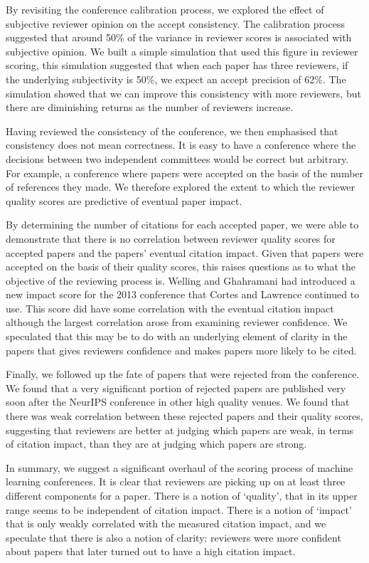 \documentclass[twoside]{article}
\begin{document}
By revisiting the conference calibration process, we explored the
effect of subjective reviewer opinion on the accept consistency. The
calibration process suggested that around 50\% of the variance in
reviewer scores is associated with subjective opinion. We built a
simple simulation that used this figure in reviewer scoring, this
simulation suggested that when each paper has three reviewers, if the
underlying subjectivity is 50\%, we expect an accept precision of
62\%. The simulation showed that we can improve this consistency with
more reviewers, but there are diminishing returns as the number of
reviewers increase.

Having reviewed the consistency of the conference, we then emphasised
that consistency does not mean correctness. It is easy to have a
conference where the decisions between two independent committees
would be correct but arbitrary. For example, a conference where papers
were accepted on the basis of the number of references they made. We
therefore explored the extent to which the reviewer quality scores are
predictive of eventual paper impact.

By determining the number of citations for each accepted paper, we
were able to demonstrate that there is no correlation between reviewer
quality scores for accepted papers and the papers' eventual citation
impact. Given that papers were accepted on the basis of their quality
scores, this raises questions as to what the objective of the
reviewing process is. Welling and Ghahramani had introduced a new
impact score for the 2013 conference that Cortes and Lawrence
continued to use. This score did have some correlation with the
eventual citation impact although the largest correlation arose from
examining reviewer confidence. We speculated that this may be to do
with an underlying element of clarity in the papers that gives
reviewers confidence and makes papers more likely to be cited.

Finally, we followed up the fate of papers that were rejected from the
conference. We found that a very significant portion of rejected
papers are published very soon after the NeurIPS conference in other
high quality venues. We found that there was weak correlation between
these rejected papers and their quality scores, suggesting that
reviewers are better at judging which papers are weak, in terms of
citation impact, than they are at judging which papers are strong.

In summary, we suggest a significant overhaul of the scoring process
of machine learning conferences. It is clear that reviewers are
picking up on at least three different components for a paper. There
is a notion of `quality', that in its upper range seems to be
independent of citation impact. There is a notion of `impact' that is
only weakly correlated with the measured citation impact, and we
speculate that there is also a notion of clarity: reviewers were more
confident about papers that later turned out to have a high citation
impact.
\end{document}
